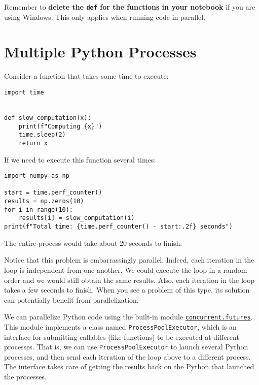\documentclass[12pt, a4paper]{article}
\begin{document}
Remember to \textbf{\textbf{delete the \texttt{def} for the functions in your notebook}} if you are using Windows.
This only applies when running code in parallel.
\section{Multiple Python Processes}
\label{sec:orga5226a2}
Consider a function that takes some time to execute:
\lstset{language=jupyter-python,label= ,caption= ,captionpos=b,numbers=none}
\begin{lstlisting}
import time


def slow_computation(x):
    print(f"Computing {x}")
    time.sleep(2)
    return x
\end{lstlisting}
If we need to execute this function several times:
\lstset{language=jupyter-python,label= ,caption= ,captionpos=b,numbers=none}
\begin{lstlisting}
import numpy as np

start = time.perf_counter()
results = np.zeros(10)
for i in range(10):
    results[i] = slow_computation(i)
print(f"Total time: {time.perf_counter() - start:.2f} seconds")
\end{lstlisting}
The entire process would take about 20 seconds to finish.

Notice that this problem is embarrassingly parallel.
Indeed, each iteration in the loop is independent from one another.
We could execute the loop in a random order and we would still obtain the same results.
Also, each iteration in the loop takes a few seconds to finish.
When you see a problem of this type, its solution can potentially benefit from parallelization.

We can parallelize Python code using the built-in module \href{https://docs.python.org/3/library/concurrent.futures.html}{\texttt{concurrent.futures}}.
This module implements a class named \texttt{ProcessPoolExecutor}, which is an interface for submitting callables (like functions) to be executed at different processes.
That is, we can use \texttt{ProcessPoolExecutor} to launch several Python processes, and then send each iteration of the loop above to a different process.
The interface takes care of getting the results back on the Python that launched the processes.
\end{document}
